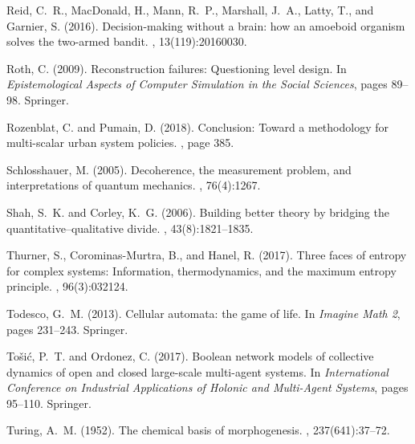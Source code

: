 \documentclass[graybox]{svmult}
\begin{document}
\begin{thebibliography}{}
Reid, C.~R., MacDonald, H., Mann, R.~P., Marshall, J.~A., Latty, T., and
  Garnier, S. (2016).
\newblock Decision-making without a brain: how an amoeboid organism solves the
  two-armed bandit.
, 13(119):20160030.

Roth, C. (2009).
\newblock Reconstruction failures: Questioning level design.
\newblock In {\em Epistemological Aspects of Computer Simulation in the Social
  Sciences}, pages 89--98. Springer.

Rozenblat, C. and Pumain, D. (2018).
\newblock Conclusion: Toward a methodology for multi-scalar urban system
  policies.
,
  page 385.

Schlosshauer, M. (2005).
\newblock Decoherence, the measurement problem, and interpretations of quantum
  mechanics.
, 76(4):1267.

Shah, S.~K. and Corley, K.~G. (2006).
\newblock Building better theory by bridging the quantitative--qualitative
  divide.
, 43(8):1821--1835.

Thurner, S., Corominas-Murtra, B., and Hanel, R. (2017).
\newblock Three faces of entropy for complex systems: Information,
  thermodynamics, and the maximum entropy principle.
, 96(3):032124.

Todesco, G.~M. (2013).
\newblock Cellular automata: the game of life.
\newblock In {\em Imagine Math 2}, pages 231--243. Springer.

To{\v{s}}i{\'c}, P.~T. and Ordonez, C. (2017).
\newblock Boolean network models of collective dynamics of open and closed
  large-scale multi-agent systems.
\newblock In {\em International Conference on Industrial Applications of
  Holonic and Multi-Agent Systems}, pages 95--110. Springer.

Turing, A.~M. (1952).
\newblock The chemical basis of morphogenesis.
, 237(641):37--72.


\end{thebibliography}
\end{document}
